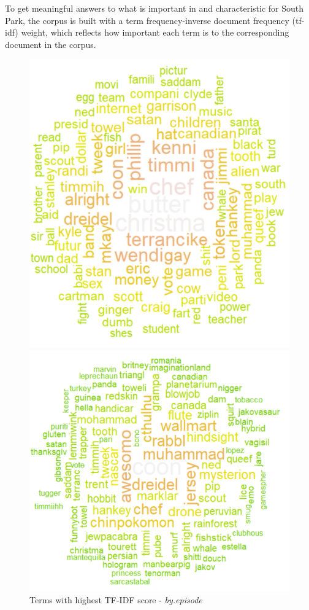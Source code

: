 \documentclass[10pt,a4paper]{article}
\begin{document}
	To get meaningful answers to what is important in and characteristic for South Park, the corpus is built with a term frequency-inverse document frequency (tf-idf) weight, which reflects how important each term is to the corresponding document in the corpus.
	\begin{figure}[!h]
  \centering
  \begin{minipage}[b]{0.45\textwidth}
    \includegraphics[width=\textwidth]{images/WordCloud-TFIDF-episode.png}
    \caption{ Terms with highest TF-IDF score - \textit{by.episode}}
	\label{fig:WordCloud-TFIDF-ep}
  \end{minipage}
  \hfill
  \begin{minipage}[b]{0.5\textwidth}
    \includegraphics[width=\textwidth]{images/WordCloud-TFIDF.png}

\end{minipage}
\end{figure}
\end{document}
